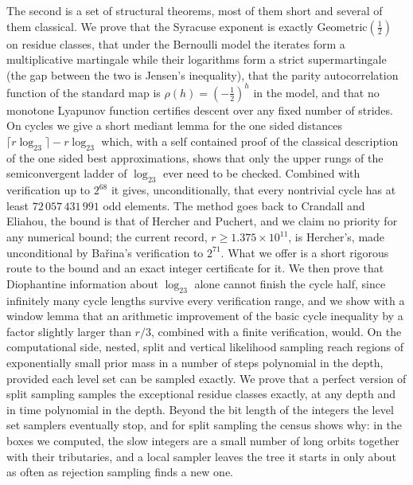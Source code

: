 The second is a set of structural theorems, most of them short and several of
them classical. We prove that the Syracuse
exponent is exactly Geometric$(\tfrac12)$ on residue classes, that under the
Bernoulli model the iterates form a multiplicative martingale while their
logarithms form a strict supermartingale (the gap between the two is Jensen's
inequality), that the parity autocorrelation function of the standard map is
$\rho(h)=(-\tfrac12)^h$ in the model, and that no monotone Lyapunov function certifies descent over any
fixed number of strides. On cycles we give a short mediant lemma for the one sided distances $\lceil r\log_23\rceil-r\log_23$ which, with a self contained proof of the classical description of the one sided best approximations, shows that only the upper rungs of the semiconvergent ladder of $\log_23$ ever need to be checked. Combined with verification up to $2^{68}$ it gives, unconditionally,
that every nontrivial cycle has at least $72\,057\,431\,991$ odd elements. The
method goes back to Crandall and Eliahou, the bound is that of Hercher and
Puchert, and we claim no priority for any numerical bound; the current record,
$r\geq1.375\times10^{11}$, is Hercher's, made unconditional by Ba\v{r}ina's
verification to $2^{71}$. What we offer is a short rigorous route to the bound
and an exact integer certificate for it. We then prove that Diophantine
information about $\log_23$ alone cannot finish the cycle half, since infinitely many cycle lengths survive
every verification range, and we show with a window lemma that an arithmetic
improvement of the basic cycle inequality by a factor slightly larger than $r/3$, combined with a finite verification, would.
On the computational side, nested, split and vertical likelihood sampling reach regions of exponentially small prior mass in a number of steps polynomial in the depth, provided each level set can be sampled exactly. We prove that a perfect version of split sampling samples the exceptional residue classes exactly, at any depth and in time polynomial in the depth. Beyond the bit length of the integers the level set samplers eventually stop, and for split sampling the census shows why: in the boxes we computed, the slow integers are a small number of long orbits together with their tributaries, and a local sampler leaves the tree it starts in only about as often as rejection sampling finds a new one.

